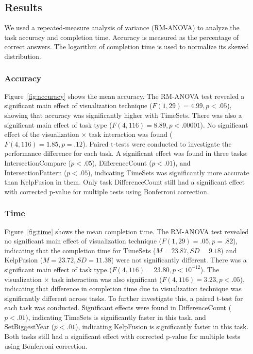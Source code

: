 \subsection{Results}
We used a repeated-measure analysis of variance (RM-ANOVA) to analyze the task accuracy and completion time. Accuracy is measured as the percentage of correct answers. The logarithm of completion time is used to normalize its skewed distribution.

\subsubsection{Accuracy}
Figure~\ref{fig:accuracy} shows the mean accuracy. The RM-ANOVA test revealed a significant main effect of visualization technique ($F(1,29)=4.99, p<.05$), showing that accuracy was significantly higher with TimeSets. There was also a significant main effect of task type ($F(4,116)=8.89, p<.00001$). No significant effect of the visualization $\times$ task interaction was found ($F(4,116)=1.85, p=.12$). Paired t-tests were conducted to investigate the performance difference for each task. A significant effect was found in three tasks: IntersectionCompare ($p<.05$), DifferenceCount ($p<.01$), and IntersectionPattern ($p<.05$), indicating TimeSets was significantly more accurate than KelpFusion in them. Only task DifferenceCount still had a significant effect with corrected p-value for multiple tests using Bonferroni correction.

\subsubsection{Time}
Figure~\ref{fig:time} shows the mean completion time. The RM-ANOVA test revealed no significant main effect of visualization technique ($F(1,29)=.05, p=.82$), indicating that the completion time for TimeSets ($M=23.87,SD=9.18$) and KelpFusion ($M=23.72,SD=11.38$) were not significantly different. There was a significant main effect of task type ($F(4,116)=23.80, p<10^{-12}$). The visualization $\times$ task interaction was also significant ($F(4,116)=3.23,p<.05$), indicating that difference in completion time due to visualization technique was significantly different across tasks. To further investigate this, a paired t-test for each task was conducted. Significant effects were found in DifferenceCount ($p<.01$), indicating TimeSets is significantly faster in this task, and SetBiggestYear ($p<.01$), indicating KelpFusion is significantly faster in this task. Both tasks still had a significant effect with corrected p-value for multiple tests using Bonferroni correction.


